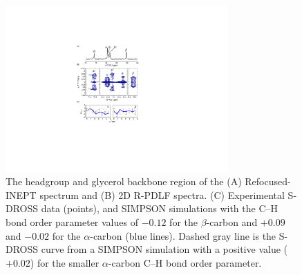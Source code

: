 \documentclass[journal=jpcbfk,manuscript=article]{achemso}
\begin{document}
\begin{figure}[!tb]
  \centering
  \includegraphics[width=8.5cm]{../Figs/fig1_POPS.pdf}
  \caption{\label{PShgSIGNSsimpson}
    The headgroup and glycerol backbone region of the (A) Refocused-INEPT spectrum and
    (B) 2D R-PDLF spectra.
    (C) Experimental S-DROSS data (points), and SIMPSON simulations with
    the C--H bond order parameter values of $-0.12$ for the $\beta$-carbon and $+0.09$ and $-0.02$
    for the $\alpha$-carbon (blue lines).
    Dashed gray line is the S-DROSS curve from a SIMPSON simulation with a positive value ($+0.02$) 
    for the smaller $\alpha$-carbon C--H bond order parameter.
  }
\end{figure}
\end{document}
